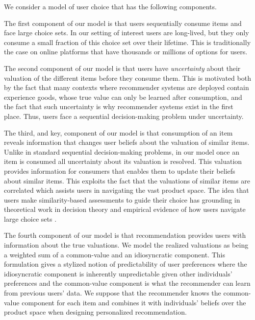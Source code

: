 \documentclass[format=acmsmall, review=false]{acmart}
\newcommand{\xhdr}[1]{\vspace{1mm} \noindent{\bf #1}}
\begin{document}
\xhdr{Our Model} We consider a model of user choice that has the following components.
\par
The first component of our model is that users sequentially consume items and face large choice sets. In our setting of interest users are long-lived, but they only consume a small fraction of this choice set over their lifetime. This is traditionally the case on online platforms that have thousands or millions of options for users.
\par
The second component of our model is that users have \textit{uncertainty} about their valuation of the different items before they consume them. This is motivated both by the fact that many contexts where recommender systems are deployed contain experience goods, whose true value can only be learned after consumption, and the fact that such uncertainty is why recommender systems exist in the first place. Thus, users face a sequential decision-making problem under uncertainty.
\par 
The third, and key, component of our model is that consumption of an item reveals information that changes user beliefs about the valuation of similar items. Unlike in standard sequential decision-making problems, in our model once an item is consumed all uncertainty about its valuation is resolved. This valuation provides information for consumers that enables them to update their beliefs about similar items. This exploits the fact that the valuations of similar items are correlated which assists users in navigating the vast product space. The idea that users make similarity-based assessments to guide their choice has grounding in theoretical work in decision theory \cite{gilboa1995case} and empirical evidence of how users navigate large choice sets \cite{schulz2019structured}.
\par 
The fourth component of our model is that recommendation provides users with information about the true valuations. We model the realized valuations as being a weighted sum of a common-value and an idiosyncratic component. This formulation gives a stylized notion of predictability of user preferences where the idiosyncratic component is inherently unpredictable given other individuals' preferences and the common-value component is what the recommender can learn from previous users' data. We suppose that the recommender knows the common-value component for each item and combines it with individuals' beliefs over the product space when designing personalized recommendation.
\end{document}
